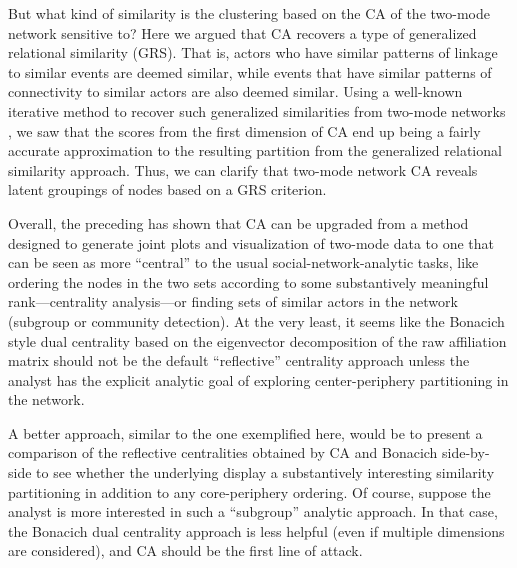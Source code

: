\documentclass[a4paper,fleqn]{cas-sc}
\begin{document}
But what kind of similarity is the clustering based on the CA of the two-mode network sensitive to? Here we argued that CA recovers a type of generalized relational similarity (GRS). That is, actors who have similar patterns of linkage to similar events are deemed similar, while events that have similar patterns of connectivity to similar actors are also deemed similar. Using a well-known iterative method to recover such generalized similarities from two-mode networks \citep{jeh2002simrank}, we saw that the scores from the first dimension of CA end up being a fairly accurate approximation to the resulting partition from the generalized relational similarity approach. Thus, we can clarify that two-mode network CA reveals latent groupings of nodes based on a GRS criterion. 

Overall, the preceding has shown that CA can be upgraded from a method designed to generate joint plots and visualization of two-mode data to one that can be seen as more ``central'' to the usual social-network-analytic tasks, like ordering the nodes in the two sets according to some substantively meaningful rank---centrality analysis---or finding sets of similar actors in the network (subgroup or community detection). At the very least, it seems like the Bonacich style dual centrality based on the eigenvector decomposition of the raw affiliation matrix should not be the default ``reflective'' centrality approach unless the analyst has the explicit analytic goal of exploring center-periphery partitioning in the network. 

A better approach, similar to the one exemplified here, would be to present a comparison of the reflective centralities obtained by CA and Bonacich side-by-side to see whether the underlying display a substantively interesting similarity partitioning in addition to any core-periphery ordering. Of course, suppose the analyst is more interested in such a ``subgroup'' analytic approach. In that case, the Bonacich dual centrality approach is less helpful (even if multiple dimensions are considered), and CA should be the first line of attack. 



%


\end{document}
